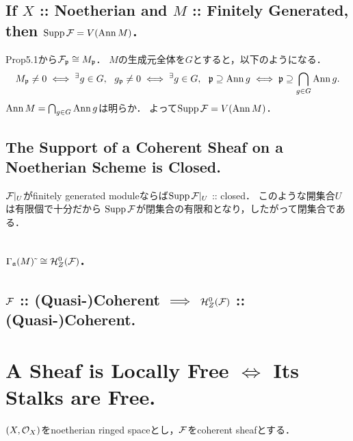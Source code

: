 \documentclass[a4paper]{jsarticle}
\begin{document}
    \subsection{If $X$ :: Noetherian and $M$ :: Finitely Generated, then $\operatorname{Supp} \mathcal{F}=V(\operatorname{Ann} M)$.}
    Prop5.1から$\mathcal{F}_{\mathfrak{p}} \cong M_{\mathfrak{p}}$．
    $M$の生成元全体を$G$とすると，以下のようになる．
    \[
        M_{\mathfrak{p}} \neq 0
        \iff {}^{\exists} g \in G,~~ g_{\mathfrak{p}} \neq 0
        \iff {}^{\exists} g \in G,~~ \mathfrak{p} \supseteq \operatorname{Ann} g
        \iff \mathfrak{p} \supseteq \bigcap_{g \in G} \operatorname{Ann} g.
    \]
    $\operatorname{Ann} M=\bigcap_{g \in G} \operatorname{Ann} g$は明らか．
    よって$\operatorname{Supp} \mathcal{F}=V(\operatorname{Ann} M)$．

    \subsection{The Support of a Coherent Sheaf on a Noetherian Scheme is Closed.}
    $\mathcal{F}|_{U}$がfinitely generated moduleならば$\operatorname{Supp} \mathcal{F}|_{U}$ :: closed．
    このような開集合$U$は有限個で十分だから
    $\operatorname{Supp} \mathcal{F}$が閉集合の有限和となり，したがって閉集合である．

    \subsection{$\Gamma_{\mathfrak{a}}(M)\,\tilde{}\, \cong \mathcal{H}_Z^0(\mathcal{F})$.}

    \subsection{$\mathcal{F}$ :: (Quasi-)Coherent $\implies$ $\mathcal{H}_Z^0(\mathcal{F})$ :: (Quasi-)Coherent.}

\section{A Sheaf is Locally Free $\iff$ Its Stalks are Free.} %
    $(X,\mathcal{O}_X)$をnoetherian ringed spaceとし，$\mathcal{F}$をcoherent sheafとする．
\end{document}
